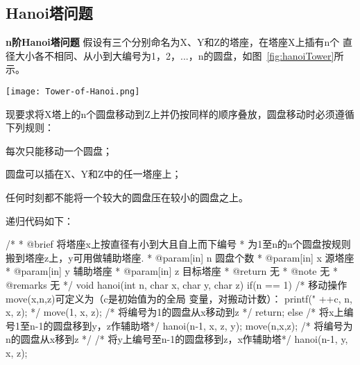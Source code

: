 \subsection{Hanoi塔问题}

\textbf{n阶Hanoi塔问题} 假设有三个分别命名为X、Y和Z的塔座，在塔座X上插有n个
直径大小各不相同、从小到大编号为1，2，...，n的圆盘，如图~\ref{fig:hanoiTower}所示。

\begin{center}
\texttt{[image: Tower-of-Hanoi.png]}\\
\label{fig:hanoiTower}
\end{center}


现要求将X塔上的n个圆盘移动到Z上并仍按同样的顺序叠放，圆盘移动时必须遵循下列规则：
\begindot
\item 每次只能移动一个圆盘；
\item 圆盘可以插在X、Y和Z中的任一塔座上；
\item 任何时刻都不能将一个较大的圆盘压在较小的圆盘之上。
\myenddot

递归代码如下：
\begin{Codex}[label=hanoi.c]
/*
 * @brief 将塔座x上按直径有小到大且自上而下编号
 * 为1至n的n个圆盘按规则搬到塔座z上，y可用做辅助塔座.
 * @param[in] n 圆盘个数
 * @param[in] x 源塔座
 * @param[in] y 辅助塔座
 * @param[in] z 目标塔座
 * @return 无
 * @note 无
 * @remarks 无
 */
void hanoi(int n, char x, char y, char z)
{
    if(n ==  1) {
        /* 移动操作move(x,n,z)可定义为（c是初始值为的全局
           变量，对搬动计数）：
           printf("%
                                        ++c, n, x, z);
        */
        move(1, x, z); /* 将编号为1的圆盘从x移动到z */
        return;
    } else {
        /* 将x上编号1至n-1的圆盘移到y，z作辅助塔*/
        hanoi(n-1, x, z, y); 
        move(n,x,z);  /* 将编号为n的圆盘从x移到z */
        /* 将y上编号至n-1的圆盘移到z，x作辅助塔*/
        hanoi(n-1, y, x, z); 
    }
}
\end{Codex}

